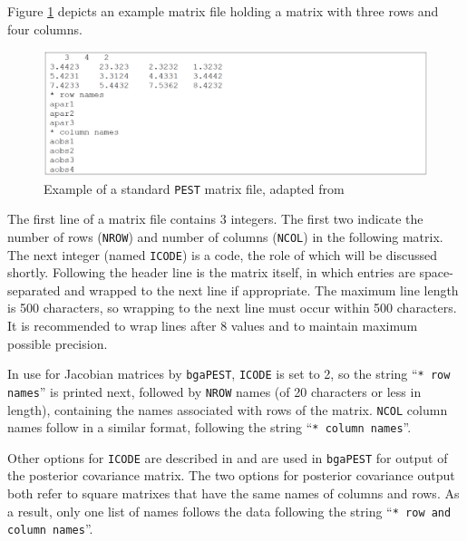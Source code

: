 \documentclass[11pt,oneside,onecolumn]{usgsreport}
\begin{document}
\begin{appendix}
Figure \ref{fig:matrix} depicts an example matrix file holding a
matrix with three rows and four columns.

\begin{figure}[!t]
\begin{centering}
\includegraphics[scale=0.25]{figures/standard_PEST_matrix}
\caption{Example of a standard \texttt{PEST} matrix file, adapted from \citet{PESTAdd}}
\label{fig:matrix}
\end{centering}
\end{figure}


The first line of a matrix file contains 3 integers. The first two
indicate the number of rows (\texttt{NROW}) and number of columns
(\texttt{NCOL}) in the following matrix. The next integer (named \texttt{ICODE})
is a code, the role of which will be discussed shortly. Following
the header line is the matrix itself, in which entries are space-separated
and wrapped to the next line if appropriate. The maximum line length
is 500 characters, so wrapping to the next line must occur within
500 characters. It is recommended to wrap lines after 8 values and
to maintain maximum possible precision.

In use for Jacobian matrices by \texttt{bgaPEST}, \texttt{ICODE} is
set to 2, so the string \textquotedblleft{}\texttt{{*} row names}\textquotedblright{}
is printed next, followed by \texttt{NROW} names (of 20 characters
or less in length), containing the names associated with rows of the
matrix. \texttt{NCOL} column names follow in a similar format, following
the string \textquotedblleft{}\texttt{{*} column names}\textquotedblright{}. 

Other options for \texttt{ICODE} are described in \citet{PESTAdd}
and are used in \texttt{bgaPEST} for output of the posterior covariance
matrix. The two options for posterior covariance output both refer
to square matrixes that have the same names of columns and rows. As
a result, only one list of names follows the data following the string
\textquotedblleft{}\texttt{{*} row and column names}\textquotedblright{}. 


\end{appendix}
\end{document}
